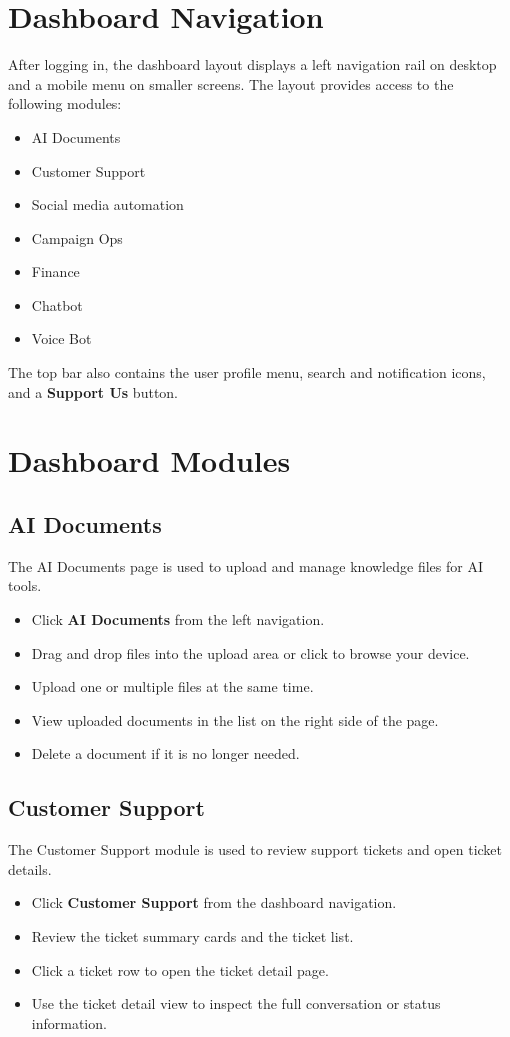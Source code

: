 \section{Dashboard Navigation}
After logging in, the dashboard layout displays a left navigation rail on desktop and a mobile menu on smaller screens. The layout provides access to the following modules:
\begin{itemize}
    \item AI Documents
    \item Customer Support
    \item Social media automation
    \item Campaign Ops
    \item Finance
    \item Chatbot
    \item Voice Bot
\end{itemize}

The top bar also contains the user profile menu, search and notification icons, and a \textbf{Support Us} button.

\section{Dashboard Modules}

\subsection{AI Documents}
The AI Documents page is used to upload and manage knowledge files for AI tools.
\begin{itemize}
    \item Click \textbf{AI Documents} from the left navigation.
    \item Drag and drop files into the upload area or click to browse your device.
    \item Upload one or multiple files at the same time.
    \item View uploaded documents in the list on the right side of the page.
    \item Delete a document if it is no longer needed.
\end{itemize}

\subsection{Customer Support}
The Customer Support module is used to review support tickets and open ticket details.
\begin{itemize}
    \item Click \textbf{Customer Support} from the dashboard navigation.
    \item Review the ticket summary cards and the ticket list.
    \item Click a ticket row to open the ticket detail page.
    \item Use the ticket detail view to inspect the full conversation or status information.
\end{itemize}

